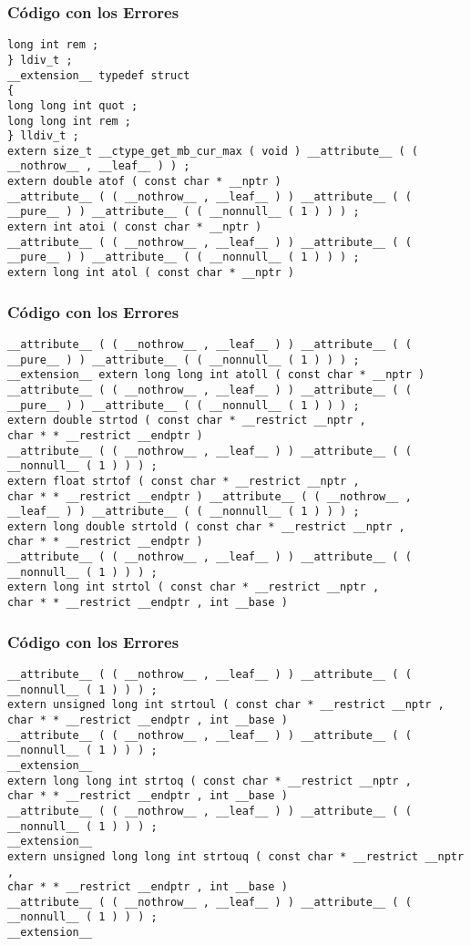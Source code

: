 \documentclass{beamer}
\begin{document}
\begin{frame}[fragile]
\frametitle{C\'odigo con los Errores}
\begin{lstlisting}[style=CStyle]
long int rem ; 
} ldiv_t ; 
__extension__ typedef struct 
{ 
long long int quot ; 
long long int rem ; 
} lldiv_t ; 
extern size_t __ctype_get_mb_cur_max ( void ) __attribute__ ( ( __nothrow__ , __leaf__ ) ) ; 
extern double atof ( const char * __nptr ) 
__attribute__ ( ( __nothrow__ , __leaf__ ) ) __attribute__ ( ( __pure__ ) ) __attribute__ ( ( __nonnull__ ( 1 ) ) ) ; 
extern int atoi ( const char * __nptr ) 
__attribute__ ( ( __nothrow__ , __leaf__ ) ) __attribute__ ( ( __pure__ ) ) __attribute__ ( ( __nonnull__ ( 1 ) ) ) ; 
extern long int atol ( const char * __nptr ) 
\end{lstlisting}
\end{frame}
\begin{frame}[fragile]
\frametitle{C\'odigo con los Errores}
\begin{lstlisting}[style=CStyle]
__attribute__ ( ( __nothrow__ , __leaf__ ) ) __attribute__ ( ( __pure__ ) ) __attribute__ ( ( __nonnull__ ( 1 ) ) ) ; 
__extension__ extern long long int atoll ( const char * __nptr ) 
__attribute__ ( ( __nothrow__ , __leaf__ ) ) __attribute__ ( ( __pure__ ) ) __attribute__ ( ( __nonnull__ ( 1 ) ) ) ; 
extern double strtod ( const char * __restrict __nptr , 
char * * __restrict __endptr ) 
__attribute__ ( ( __nothrow__ , __leaf__ ) ) __attribute__ ( ( __nonnull__ ( 1 ) ) ) ; 
extern float strtof ( const char * __restrict __nptr , 
char * * __restrict __endptr ) __attribute__ ( ( __nothrow__ , __leaf__ ) ) __attribute__ ( ( __nonnull__ ( 1 ) ) ) ; 
extern long double strtold ( const char * __restrict __nptr , 
char * * __restrict __endptr ) 
__attribute__ ( ( __nothrow__ , __leaf__ ) ) __attribute__ ( ( __nonnull__ ( 1 ) ) ) ; 
extern long int strtol ( const char * __restrict __nptr , 
char * * __restrict __endptr , int __base ) 
\end{lstlisting}
\end{frame}
\begin{frame}[fragile]
\frametitle{C\'odigo con los Errores}
\begin{lstlisting}[style=CStyle]
__attribute__ ( ( __nothrow__ , __leaf__ ) ) __attribute__ ( ( __nonnull__ ( 1 ) ) ) ; 
extern unsigned long int strtoul ( const char * __restrict __nptr , 
char * * __restrict __endptr , int __base ) 
__attribute__ ( ( __nothrow__ , __leaf__ ) ) __attribute__ ( ( __nonnull__ ( 1 ) ) ) ; 
__extension__ 
extern long long int strtoq ( const char * __restrict __nptr , 
char * * __restrict __endptr , int __base ) 
__attribute__ ( ( __nothrow__ , __leaf__ ) ) __attribute__ ( ( __nonnull__ ( 1 ) ) ) ; 
__extension__ 
extern unsigned long long int strtouq ( const char * __restrict __nptr , 
char * * __restrict __endptr , int __base ) 
__attribute__ ( ( __nothrow__ , __leaf__ ) ) __attribute__ ( ( __nonnull__ ( 1 ) ) ) ; 
__extension__ 
\end{lstlisting}
\end{frame}
\end{document}
